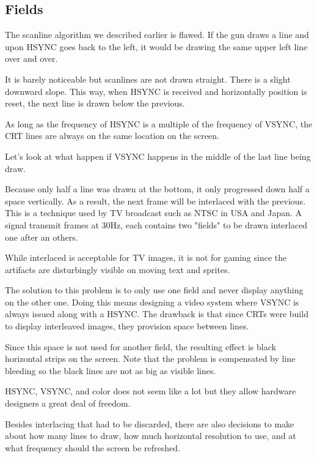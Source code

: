 \subsection{Fields}

The scanline algorithm we described earlier is flawed. If the gun draws a line and upon HSYNC goes back to the left, it would be drawing the same upper left line over and over. 

It is barely noticeable but scanlines are not drawn straight. There is a slight downward slope. This way, when HSYNC is received and horizontally position is reset, the next line is drawn below the previous.




As long as the frequency of HSYNC is a multiple of the frequency of VSYNC, the CRT lines are always on the same location on the screen.

Let's look at what happen if VSYNC happens in the middle of the last line being draw.


Because only half a line was drawn at the bottom, it only progressed down half a space vertically. As a result, the next frame will be interlaced with the previous. This is a technique used by TV broadcast such as NTSC in USA and Japan. A signal transmit frames at 30Hz, each contains two "fields" to be drawn interlaced one after an others.

While interlaced is acceptable for TV images, it is not for gaming since the artifacts are disturbingly visible on moving text and sprites. 

The solution to this problem is to only use one field and never display anything on the other one. Doing this means designing a video system where VSYNC is always issued along with a HSYNC. The drawback is that since CRTs were build to display interleaved images, they provision space between lines. 

Since this space is not used for another field, the resulting effect is black horizontal strips on the screen. Note that the problem is compensated by line bleeding so the black lines are not as big as visible lines.


HSYNC, VSYNC, and color does not seem like a lot but they allow hardware designers a great deal of freedom. 

Besides interlacing that had to be discarded, there are also decisions to make about how many lines to draw, how much horizontal resolution to use, and at what frequency should the screen be refreshed.





